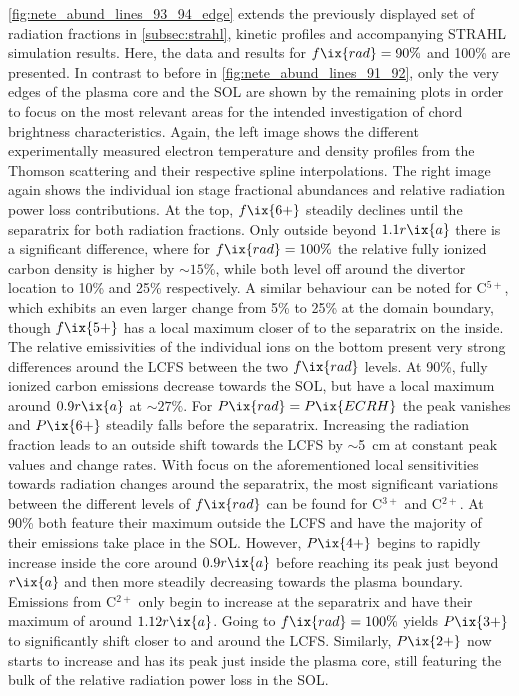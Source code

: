         \cref{fig:nete_abund_lines_93_94_edge} extends the previously displayed set of radiation fractions in \cref{subsec:strahl}, kinetic profiles and accompanying STRAHL simulation results. Here, the data and results for $f\ix{rad}=90\%$ and 100\% are presented. In contrast to before in \cref{fig:nete_abund_lines_91_92}, only the very edges of the plasma core and the SOL are shown by the remaining plots in order to focus on the most relevant areas for the intended investigation of chord brightness characteristics. Again, the left image shows the different experimentally measured electron temperature and density profiles from the Thomson scattering and their respective spline interpolations. The right image again shows the individual ion stage fractional abundances and relative radiation power loss contributions. At the top, $f\ix{6+}$ steadily declines until the separatrix for both radiation fractions. Only outside beyond $1.1r\ix{a}$ there is a significant difference, where for $f\ix{rad}=100\%$ the relative fully ionized carbon density is higher by $\sim15\%$, while both level off around the divertor location to 10\% and 25\% respectively. A similar behaviour can be noted for C$^{5+}$, which exhibits an even larger change from 5\% to 25\% at the domain boundary, though $f\ix{5+}$ has a local maximum closer of to the separatrix on the inside. The relative emissivities of the individual ions on the bottom present very strong differences around the LCFS between the two $f\ix{rad}$ levels. At 90\%, fully ionized carbon emissions decrease towards the SOL, but have a local maximum around $0.9r\ix{a}$ at $\sim27\%$. For $P\ix{rad}=P\ix{ECRH}$ the peak vanishes and $P\ix{6+}$ steadily falls before the separatrix. Increasing the radiation fraction leads to an outside shift towards the LCFS by $\sim$\SI{5}{\centi\meter} at constant peak values and change rates. With focus on the aforementioned local sensitivities towards radiation changes around the separatrix, the most significant variations between the different levels of $f\ix{rad}$ can be found for C$^{3+}$ and C$^{2+}$. At 90\% both feature their maximum outside the LCFS and have the majority of their emissions take place in the SOL. However, $P\ix{4+}$ begins to rapidly increase inside the core around $0.9r\ix{a}$ before reaching its peak just beyond $r\ix{a}$ and then more steadily decreasing towards the plasma boundary. Emissions from C$^{2+}$ only begin to increase at the separatrix and have their maximum of around $1.12r\ix{a}$. Going to $f\ix{rad}=100\%$ yields $P\ix{3+}$ to significantly shift closer to and around the LCFS. Similarly, $P\ix{2+}$ now starts to increase and has its peak just inside the plasma core, still featuring the bulk of the relative radiation power loss in the SOL.\\%
